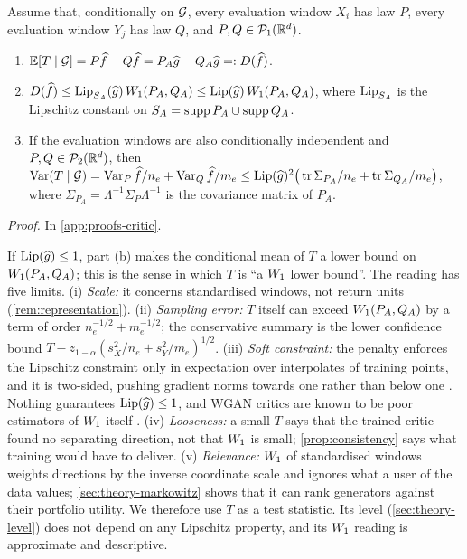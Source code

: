 \begin{proposition}
\label{prop:unbiased}
Assume that, conditionally on $\mathcal{G}$, every evaluation window $X_i$ has law $P$, every
evaluation window $Y_j$ has law $Q$, and $P,Q\in\mathcal{P}_{1}(\mathbb{R}^d)$.
\begin{enumerate}
  \item[(a)] $\mathbb{E}[T\mid\mathcal{G}]=P\widehat{f}-Q\widehat{f}=P_A\widehat{g}-Q_A\widehat{g}=:D(\widehat{f})$.
  \item[(b)] $D(\widehat{f})\le\operatorname{Lip}_{S_A}(\widehat{g})\,W_{1}(P_A,Q_A)\le\operatorname{Lip}(\widehat{g})\,W_{1}(P_A,Q_A)$, where
  $\operatorname{Lip}_{S_A}$ is the Lipschitz constant on $S_A=\operatorname{supp} P_A\cup\operatorname{supp} Q_A$.
  \item[(c)] If the evaluation windows are also conditionally independent and
  $P,Q\in\mathcal{P}_{2}(\mathbb{R}^d)$, then
  $\operatorname{Var}(T\mid\mathcal{G})=\operatorname{Var}_P\widehat{f}/n_e+\operatorname{Var}_Q\widehat{f}/m_e\le\operatorname{Lip}(\widehat{g})^2\big(\operatorname{tr}\Sigma_{P_A}/n_e+\operatorname{tr}\Sigma_{Q_A}/m_e\big)$,
  where $\Sigma_{P_A}=\Lambda^{-1}\Sigma_P\Lambda^{-1}$ is the covariance matrix of $P_A$.
\end{enumerate}
\end{proposition}
\noindent\textit{Proof.} In \cref{app:proofs-critic}.

\begin{remark}\label{rem:gp-soft}
If $\operatorname{Lip}(\widehat{g})\le1$, part (b) makes the conditional mean of $T$ a lower bound on $W_{1}(P_A,Q_A)$;
this is the sense in which $T$ is ``a $W_{1}$ lower bound''. The reading has five limits.
(i) \emph{Scale:} it concerns standardised windows, not return units (\cref{rem:representation}).
(ii) \emph{Sampling error:} $T$ itself can exceed $W_{1}(P_A,Q_A)$ by a term of order
$n_e^{-1/2}+m_e^{-1/2}$; the conservative summary is the lower confidence bound
$T-z_{1-\alpha}(s_X^2/n_e+s_Y^2/m_e)^{1/2}$.
(iii) \emph{Soft constraint:} the penalty enforces the Lipschitz constraint only in expectation
over interpolates of training points, and it is two-sided, pushing gradient norms towards one
rather than below one \citep{petzka_2018_regularization}. Nothing guarantees $\operatorname{Lip}(\widehat{g})\le1$,
and WGAN critics are known to be poor estimators of $W_{1}$ itself
\citep{mallasto2019well,stanczuk_2021_wasserstein}.
(iv) \emph{Looseness:} a small $T$ says that the trained critic found no separating direction, not
that $W_{1}$ is small; \cref{prop:consistency} says what training would have to deliver.
(v) \emph{Relevance:} $W_{1}$ of standardised windows weights directions by the inverse coordinate
scale and ignores what a user of the data values; \cref{sec:theory-markowitz} shows that it can
rank generators against their portfolio utility.
We therefore use $T$ as a test statistic. Its level (\cref{sec:theory-level}) does not depend on
any Lipschitz property, and its $W_{1}$ reading is approximate and descriptive.
\end{remark}

